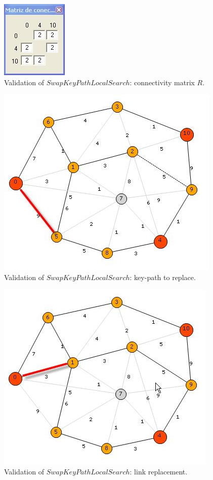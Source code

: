 \begin{figure}[H]
 \begin{center}
\includegraphics[scale=1.3]{27-2.jpg}
\caption{Validation of $SwapKeyPathLocalSearch$: connectivity matrix $R$.} \label{fig:27-2}
 \end{center}
\end{figure}

\begin{figure}[H]
\begin{center}
\includegraphics[scale=0.9]{28.jpg}
\caption{Validation of $SwapKeyPathLocalSearch$: key-path to replace.}\label{fig:28}
\end{center} 
\end{figure}

\begin{figure}[H]
\begin{center}
\includegraphics[scale=0.9]{29.jpg}
\caption{Validation of $SwapKeyPathLocalSearch$: link replacement.}\label{fig:29}
\end{center} 
\end{figure}

